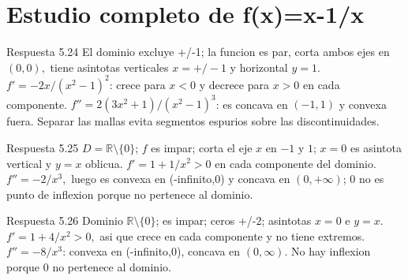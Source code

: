 \documentclass[10pt,a4paper,oneside,openany]{book}
\begin{document}
\section{Estudio completo de f(x)=x-1/x}
\begin{PSevenAnswerFixed}{Respuesta 5.24}
El dominio excluye +/-1; la funcion es par, corta ambos ejes en \((0,0),\) tiene asintotas verticales \(x=+/-1\) y horizontal \(y=1\). \(f'=-2x/(x^{2}-1)^{2}\): crece para \(x<0\) y decrece para \(x>0\) en cada componente. \(f''=2(3x^{2}+1)/(x^{2}-1)^{3}\): es concava en \((-1,1)\) y convexa fuera. Separar las mallas evita segmentos espurios sobre las discontinuidades.
\end{PSevenAnswerFixed}
\begin{PSevenAnswerFixed}{Respuesta 5.25}
\(D=\mathbb{R}\setminus \{0\}\); \(f\) es impar; corta el eje \(x\) en \(-1\) y \(1\); \(x=0\) es asintota vertical y \(y=x\) oblicua. \(f'=1+1/x^{2}>0\) en cada componente del dominio. \(f''=-2/x^{3},\) luego es convexa en (-infinito,0) y concava en \((0,+\infty )\); \(0\) no es punto de inflexion porque no pertenece al dominio.
\end{PSevenAnswerFixed}
\begin{PSevenAnswerFixed}{Respuesta 5.26}
Dominio \(\mathbb{R}\setminus \{0\}\); es impar; ceros +/-2; asintotas \(x=0\) e \(y=x\). \(f'=1+4/x^{2}>0,\) asi que crece en cada componente y no tiene extremos. \(f''=-8/x^{3}\): convexa en (-infinito,0), concava en \((0,\infty )\). No hay inflexion porque \(0\) no pertenece al dominio.
\end{PSevenAnswerFixed}
\end{document}
